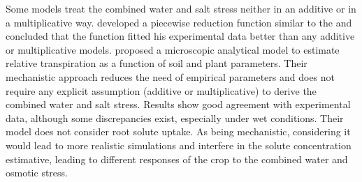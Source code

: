 Some models treat the combined water and salt stress neither in an additive or in a multiplicative way. \citeonline[homaee] developed a piecewise reduction function similar to the \citeonline[feddes78] and concluded that the function fitted his experimental data better than any additive or multiplicative models.
\citeonline[liersolute] proposed a microscopic analytical model to estimate relative transpiration as a function of soil and plant parameters. 
Their mechanistic approach reduces the need of empirical parameters and does not require any explicit assumption (additive or multiplicative) to derive the combined water and salt stress. 
Results show good agreement with experimental data, although some discrepancies exist, especially under wet conditions. 
Their model does not consider root solute uptake.
As being mechanistic, considering it would lead to more realistic simulations and interfere in the solute concentration estimative, leading to different responses of the crop to the combined water and osmotic stress.





